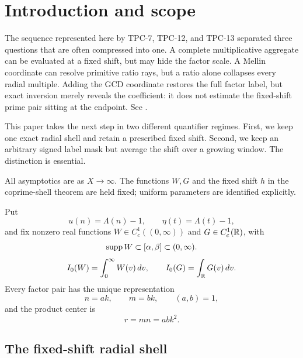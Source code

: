 \section{Introduction and scope}
\label{sec:introduction}

The sequence represented here by TPC-7, TPC-12, and TPC-13 separated
three questions that are often compressed into one.  A complete
multiplicative aggregate can be evaluated
at a fixed shift, but may hide the factor scale.  A Mellin coordinate can
resolve primitive ratio rays, but a ratio alone collapses every radial
multiple.  Adding the GCD coordinate restores the full factor label, but
exact inversion merely reveals the coefficient: it does not estimate the
fixed-shift prime pair sitting at the endpoint.  See
\citet{WangTPC7,WangTPC12,WangTPC13}.

This paper takes the next step in two different quantifier regimes.  First,
we keep one exact radial shell and retain a prescribed fixed shift.  Second,
we keep an arbitrary signed label mask but average the shift over a growing
window.  The distinction is essential.

All asymptotics are as $X\to\infty$.  The functions $W,G$ and the
fixed shift $h$ in the coprime-shell theorem are held fixed; uniform
parameters are identified explicitly.

Put
\begin{equation}
 u(n)=\Lambda(n)-1,
 \qquad
 \eta(t)=\Lambda(t)-1,
 \label{eq:source-target-residuals}
\end{equation}
and fix nonzero real functions
$W\in C_c^1((0,\infty))$ and $G\in C_c^1(\mathbb R)$, with
\begin{equation}
 \operatorname{supp} W\subset[\alpha,\beta]
 \subset(0,\infty).
 \label{eq:W-support}
\end{equation}
\begin{equation}
 I_0(W)=\int_0^\infty W(v)\,dv,
 \qquad
 I_0(G)=\int_{\mathbb R}G(v)\,dv.
 \label{eq:I0-definitions}
\end{equation}
Every factor pair has the unique representation
\begin{equation}
 n=ak,\qquad m=bk,\qquad (a,b)=1,
 \label{eq:gcd-coordinates}
\end{equation}
and the product center is
\begin{equation}
 r=mn=abk^2.
 \label{eq:product-center}
\end{equation}

\subsection{The fixed-shift radial shell}

